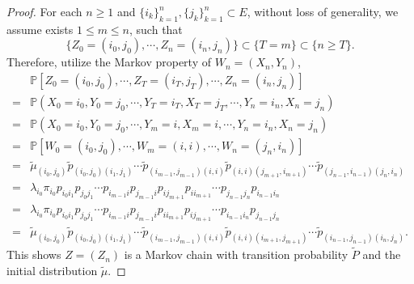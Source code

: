 \documentclass[12pt]{article}
\renewcommand{\(}{\left(}%
\renewcommand{\)}{\right)}%
\renewcommand{\[}{\left[}%
\renewcommand{\]}{\right]}%
\newcommand{\p}{\mathbb{P}}
\newtheorem{proof}{Proof.}}
\begin{document}
  \begin{proof}
   For each $n\geq 1$ and $\{i_k\}_{k=1}^n,\{j_k\}_{k=1}^n\subset E$, without loss of generality, we assume exists $1\leq m\leq n$, such that
   \begin{equation*}
    \{Z_0=(i_0,j_0),\cdots,Z_n=(i_n,j_n)\}\subset\{T=m\}\subset  \{n\geq T\}.
   \end{equation*}
   Therefore, utilize the Markov property of $W_n=(X_n,Y_n)$,
   \begin{equation*}
    \begin{split}
     &\p[Z_0=(i_0,j_0),\cdots,Z_T=(i_T,j_T),\cdots, Z_n=(i_n,j_n) ]\\
     =&\p(X_0=i_0,Y_0=j_0,\cdots, Y_T=i_T,X_T=j_T,\cdots, Y_n=i_n,X_n=j_n )\\
     =&\p(X_0=i_0,Y_0=j_0,\cdots, Y_m=i,X_m=i,\cdots, Y_n=i_n,X_n=j_n )\\
     =&\p[W_0=(i_0,j_0),\cdots,W_m=(i,i),\cdots, W_{n}=(j_{n},i_{n}) ]\\
     =&\tilde{\mu}_{(i_0,j_0)}\tilde{p}_{(i_0,j_0)(i_1,j_1)}\cdots \tilde{p}_{(i_{m-1},j_{m-1})(i,i)}\tilde{p}_{(i,i)(j_{m+1},i_{m+1})}\cdots\tilde{p}_{(j_{n-1},i_{n-1})(j_{n},i_{n})} \\
     =&\lambda_{i_0}\pi_{i_0}p_{i_0i_1}p_{j_0j_1}\cdots p_{i_{m-1}i}p_{j_{m-1}i}p_{ij_{m+1}}p_{ii_{m+1}}\cdots p_{j_{n-1}j_n}p_{i_{n-1}i_n}\\
     =&\lambda_{i_0}\pi_{i_0}p_{i_0i_1}p_{j_0j_1}\cdots p_{i_{m-1}i}p_{j_{m-1}i}p_{ii_{m+1}}p_{ij_{m+1}}\cdots p_{i_{n-1}i_n}p_{j_{n-1}j_n}\\
     =&\tilde{\mu}_{(i_0,j_0)}\tilde{p}_{(i_0,j_0)(i_1,j_1)}\cdots \tilde{p}_{(i_{m-1},j_{m-1})(i,i)}\tilde{p}_{(i,i)(i_{m+1},j_{m+1})}\cdots\tilde{p}_{(i_{n-1},j_{n-1})(i_{n},j_{n})}.
    \end{split}
   \end{equation*}
   This shows $Z=(Z_n)$ is a Markov chain with transition probability $\tilde{P}$ and the initial distribution $\tilde{\mu}$.
  \end{proof}
\end{document}
